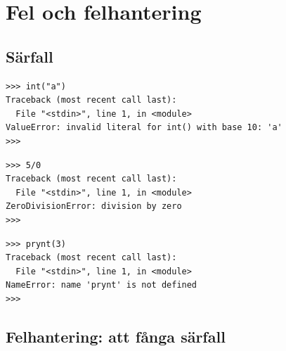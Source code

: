 \mode*

\section{Fel och felhantering}

\subsection{Särfall}

\begin{frame}[fragile]
  \begin{example}
    \begin{verbatim}
>>> int("a")
Traceback (most recent call last):
  File "<stdin>", line 1, in <module>
ValueError: invalid literal for int() with base 10: 'a'
>>> 
    \end{verbatim}
  \end{example}
\end{frame}

\begin{frame}[fragile]
  \begin{example}
    \begin{verbatim}
>>> 5/0
Traceback (most recent call last):
  File "<stdin>", line 1, in <module>
ZeroDivisionError: division by zero
>>> 
    \end{verbatim}
  \end{example}
\end{frame}

\begin{frame}[fragile]
  \begin{example}
    \begin{verbatim}
>>> prynt(3)
Traceback (most recent call last):
  File "<stdin>", line 1, in <module>
NameError: name 'prynt' is not defined
>>> 
    \end{verbatim}
  \end{example}
\end{frame}

\subsection{Felhantering: att fånga särfall}

